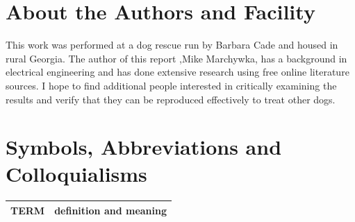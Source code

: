 \begin{mdpicomment}
\section{About the Authors and Facility}
This work was performed at a dog rescue run by Barbara Cade and
housed in rural Georgia.  The author of this report 
,Mike Marchywka,
has a background in electrical engineering and 
has done extensive research using free online literature sources.  
I hope to find additional people interested in critically 
examining the results and verify that they can be reproduced
effectively to treat other dogs.

\section{Symbols, Abbreviations and Colloquialisms}

\noindent
\begin{tabular}{@{}ll}
TERM & definition and meaning   \\
\hline
\end{tabular} %



\end{mdpicomment}
